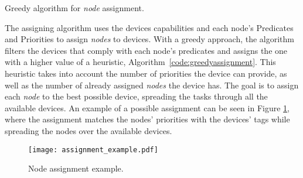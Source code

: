 \begin{algorithm}
\BlankLine
{}
\BlankLine
{}
\caption{Greedy algorithm for \textit{node} assignment.}
\label{code:greedyassignment}
\end{algorithm}

The assigning algorithm uses the devices capabilities and each node's Predicates and Priorities to assign \textit{nodes} to devices. With a greedy approach, the algorithm filters the devices that comply with each node's predicates and assigns the one with a higher value of a heuristic, \cf Algorithm~\ref{code:greedyassignment}. This heuristic takes into account the number of priorities the device can provide, as well as the number of already assigned \textit{nodes} the device has. The goal is to assign each \textit{node} to the best possible device, spreading the tasks through all the available devices. An example of a possible assignment can be seen in Figure \ref{fig:assigment_example}, where the assignment matches the nodes' priorities with the devices' tags while spreading the nodes over the available devices.

\begin{figure}[h]
\centering
\texttt{[image: assignment\_example.pdf]}
\caption[Node assignment example.]{Node assignment example.}\label{fig:assigment_example}
\end{figure}

